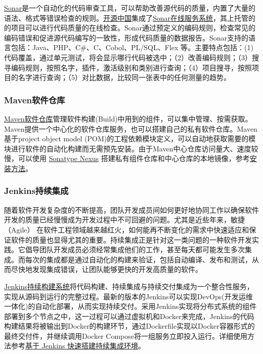 \documentclass[letterpaper,10pt,english]{sphinxmanual}
\begin{document}
\href{https://github.com/SonarSource}{Sonar}是一个自动化的代码审查工具，可以帮助改善源代码的质量，内置了大量的语法、格式等错误检查的规则。\href{http://git.oschina.net}{开源中国}集成了\href{http://sonar.oschina.net/}{Sonar在线服务系统}，其上托管的的项目可以进行代码质量的在线检查。Sonar通过预定义的编码规则，检查常见的编码错误和促进源代码编写的一致性，形成代码质量的数据报告。Sonar支持的语言包括：Java、PHP、C\#、C、Cobol、PL/SQL、Flex
等。主要特点包括：(1)代码覆盖，通过单元测试，将会显示哪行代码被选中；（2）改善编码规则；（3）搜寻编码规则，按照名字，插件，激活级别和类别进行查询；（4）项目搜寻，按照项目的名字进行查询；（5）对比数据，比较同一张表中的任何测量的趋势。


\subsubsection{Maven软件仓库}
\label{gispark_paas:Maven_u8f6f_u4ef6_u4ed3_u5e93}
\href{http://maven.apache.org/}{Maven软件仓库}管理软件构建(Build)中用到的组件，可以集中管理、按需获取。Maven提供一个中心化的软件仓库服务，也可以搭建自己的私有软件仓库。Maven基于project
object model
(POM)的工程依赖模块定义，可以自动地获取需要的模块进行软件的自动化构建而无需预先安装。由于Maven中心仓库访问量大、速度较慢，可以使用
\href{http://www.sonatype.org}{Sonatype Nexus}
搭建私有组件仓库和中心仓库的本地镜像，参考\href{http://my.oschina.net/MrMichael/blog/295979}{安装方法}。


\subsubsection{Jenkins持续集成}
\label{gispark_paas:Jenkins_u6301_u7eed_u96c6_u6210}
随着软件开发复杂度的不断提高，团队开发成员间如何更好地协同工作以确保软件开发的质量已经慢慢成为开发过程中不可回避的问题。尤其是近些年来，敏捷（Agile）
在软件工程领域越来越红火，如何能再不断变化的需求中快速适应和保证软件的质量也显得尤其的重要。持续集成正是针对这一类问题的一种软件开发实践。它倡导团队开发成员必须经常集成他们的工作，甚至每天都可能发生多次集成。而每次的集成都是通过自动化的构建来验证，包括自动编译、发布和测试，从而尽快地发现集成错误，让团队能够更快的开发高质量的软件。

\href{https://jenkins.io/index.html}{Jenkins持续构建系统}将代码构建、持续集成与持续交付集成为一个整合性服务，实现从源码到运行的完整过程。最新的版本的Jenkins可以实现DevOps(开发运维一体化)的自动化部署，从而实现持续交付。采用Jenkins实现将分布式系统的组件部署到多个节点之中，这一过程可以通过虚拟机和Docker来完成，Jenkins的代码构建结果将被输出到Docker的构建环节，通过Dockerfile实现以Docker容器形式的最终交付件，并继续调用Docker
Compose将一组服务立即投入运行。详细使用方法参考\href{http://www.ibm.com/developerworks/cn/java/j-lo-jenkins/}{基于 Jenkins
快速搭建持续集成环境}。
\end{document}
